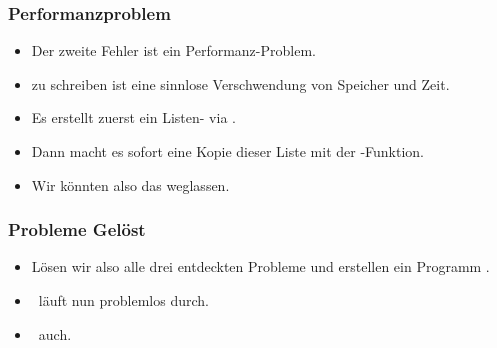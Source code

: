 \documentclass[aspectratio=169,mathserif,notheorems]{beamer}%
\begin{document}
%
\begin{frame}[t]%
\frametitle{Performanzproblem}%
\begin{itemize}%
\item Der zweite Fehler ist ein Performanz-Problem.%
%
\item<2->  zu schreiben ist eine sinnlose Verschwendung von Speicher und Zeit.%
%
\item<3-> Es erstellt zuerst ein Listen- via \pythonil{[1, 2, 3]}.%
%
\item<4-> Dann macht es sofort eine Kopie dieser Liste mit der -Funktion.%
%
\item<5-> Wir könnten also das  weglassen.%
%
\end{itemize}%
%
%
\end{frame}%
%
\begin{frame}[t]%
\frametitle{Probleme Gelöst}%
%
%
%
%
\begin{itemize}%
\item Lösen wir also alle drei entdeckten Probleme und erstellen ein Programm .%
\item<3-> \mypy\ läuft nun problemlos durch.%
\item<4-> \ruff\ auch.%
\end{itemize}%
%
%
%
%
\end{frame}%
%
\end{document}
